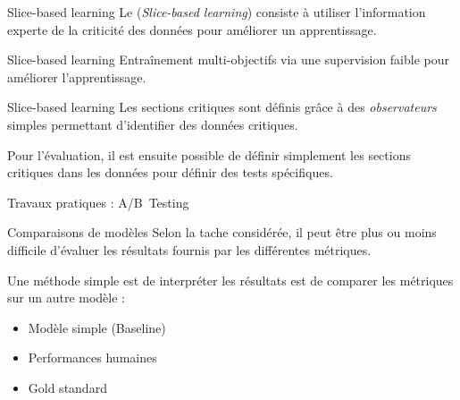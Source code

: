 \begin{frame}{Slice-based learning}
  Le (\emph{Slice-based learning}) consiste à utiliser l'information experte de la criticité des données pour améliorer un apprentissage.
  

\end{frame}

\begin{frame}{Slice-based learning}
  Entraînement multi-objectifs via une supervision faible pour améliorer l'apprentissage.
  

\end{frame}

\begin{frame}{Slice-based learning}
  Les sections critiques sont définis grâce à des \og \emph{observateurs}\fg{} simples permettant d'identifier des données critiques.

  Pour l'évaluation, il est ensuite possible de définir simplement les sections critiques dans les données pour définir des tests spécifiques.
\end{frame}

\begin{frame}{Travaux pratiques : A/B~Testing}
\end{frame}




\begin{frame}{Comparaisons de modèles}
Selon la tache considérée, il peut être plus ou moins difficile d'évaluer les résultats fournis par les différentes métriques.

Une méthode simple est de interpréter les résultats est de comparer les métriques sur un autre modèle :
\begin{itemize}
  \item Modèle simple (Baseline)
  \item Performances humaines
  \item Gold standard
\end{itemize}
\end{frame}


